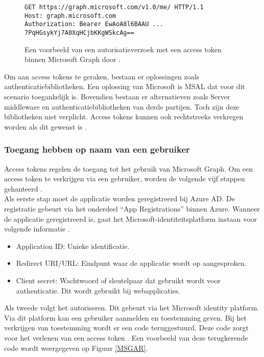 \begin{figure}[h]
    \scriptsize
    \begin{verbatim}
GET https://graph.microsoft.com/v1.0/me/ HTTP/1.1
Host: graph.microsoft.com
Authorization: Bearer EwAoA8l6BAAU ... 7PqHGsykYj7A0XqHCjbKKgWSkcAg==
    \end{verbatim}    
    \caption[Voorbeeld Microsoft Graph Authorization Request]{Een voorbeeld van een autorisatieverzoek met een access token binnen Microsoft Graph door \textcite{Microsoft2022b}.}
    \label{MSGA}
\end{figure}

Om aan access tokens te geraken, bestaan er oplossingen zoals authenticatiebibliotheken. Een oplossing van Microsoft is \ac{MSAL} dat voor dit scenario toegankelijk is. Bovendien bestaan er alternatieven zoals Server middleware en authenticatiebibliotheken van derde partijen. Toch zijn deze bibliotheken niet verplicht. Access tokens kunnen ook rechtstreeks verkregen worden als dit gewenst is \autocite{Microsoft2022b}. 

\subsubsection{Toegang hebben op naam van een gebruiker}


Access tokens regelen de toegang tot het gebruik van Microsoft Graph. Om een access token te verkrijgen via een gebruiker, worden de volgende vijf stappen gehanteerd \autocite{Microsoft2023r}. \\

Als eerste stap moet de applicatie worden geregistreerd bij Azure \ac{AD}. De registratie gebeurt via het onderdeel “App Registrations” binnen Azure. Wanneer de applicatie geregistreerd is, gaat het Microsoft-identiteitsplatform instaan voor volgende informatie \autocite{Microsoft2023r}. 

\begin{itemize}
    \item Application ID: Unieke identificatie.
    \item Redirect \ac{URI}/\Ac{URL}: Eindpunt waar de applicatie wordt op aangesproken.
    \item Client secret: Wachtwoord of sleutelpaar dat gebruikt wordt voor authenticatie. Dit wordt gebruikt bij webapplicaties.
\end{itemize}

Als tweede volgt het autoriseren. Dit gebeurt via het Microsoft identity platform. Via dit platform kan een gebruiker aanmelden en toestemming geven. Bij het verkrijgen van toestemming wordt er een code teruggestuurd. Deze code zorgt voor het verlenen van een access token \autocite{Microsoft2023r}. Een voorbeeld van deze terugkerende code wordt weergegeven op Figuur \ref{MSGAR}. \\

